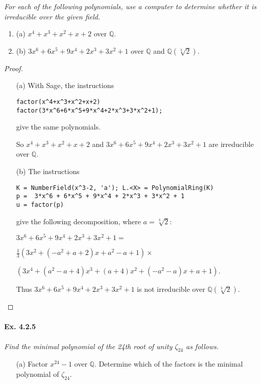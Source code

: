 \documentclass[11pt,a4paper]{article}
\newcommand{\be} {\begin{enumerate}}
\newcommand{\ee} {\end{enumerate}}
\newcommand{\Q}{\mathbb{Q}}
\begin{document}
{\it For each of the following polynomials, use a computer to determine whether it is irreducible over the given field.
\be
\item[(a)] $x^4 + x^3 + x^2 + x + 2$ over $\Q$.
\item[(b)] $3x^6 + 6 x^5 + 9x^4 + 2x^3 + 3x^2 + 1$ over $\Q$ and $\Q(\sqrt[3]{2})$.
\ee
}

\begin{proof}
\begin{enumerate}
\item[(a)]
With Sage, the instructions
\begin{verbatim}
factor(x^4+x^3+x^2+x+2)
factor(3*x^6+6*x^5+9*x^4+2*x^3+3*x^2+1);
\end{verbatim}
give the same polynomials.

So $x^4+x^3+x^2+x+2$ and $3x^6+6x^5+9x^4+2x^3+3x^2+1$ are irreducible over $\Q$.

\item[(b)]
The instructions

\begin{verbatim}
K = NumberField(x^3-2, 'a'); L.<X> = PolynomialRing(K)
p =  3*x^6 + 6*x^5 + 9*x^4 + 2*x^3 + 3*x^2 + 1
u = factor(p)
\end{verbatim}
give the following decomposition, where $a=\sqrt[3]{2}$:

$3x^6+6x^5+9x^4+2x^3+3x^2+1 =$ 

$\frac{1}{3} (3x^2 + (-a^2 + a + 2)x + a^2 - a + 1)\times$

$(3x^4 + (a^2 - a + 4)x^3 + (a + 4)x^2 + (-a^2 - a)x + a + 1)$.

Thus $3x^6+6x^5+9x^4+2x^3+3x^2+1$ is not irreducible over $\Q(\sqrt[3]{2})$.
\end{enumerate}
\end{proof}

\paragraph{Ex. 4.2.5}

{\it Find the minimal polynomial of the 24th root of unity $\zeta_{24}$ as follows.
\begin{enumerate}
\item[(a)] Factor $x^{24} - 1$ over $\Q$.
Determine which of the factors is the minimal polynomial of $\zeta_{24}$.
\end{enumerate}
}
\end{document}
